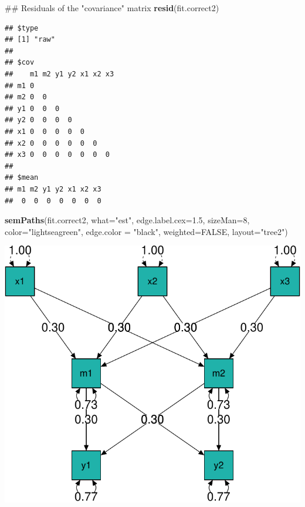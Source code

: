 \documentclass[]{article}
\newenvironment{Shaded}{\begin{snugshade}}{\end{snugshade}}
\newcommand{\KeywordTok}[1]{\textcolor[rgb]{0.13,0.29,0.53}{\textbf{#1}}}
\newcommand{\DataTypeTok}[1]{\textcolor[rgb]{0.13,0.29,0.53}{#1}}
\newcommand{\DecValTok}[1]{\textcolor[rgb]{0.00,0.00,0.81}{#1}}
\newcommand{\FloatTok}[1]{\textcolor[rgb]{0.00,0.00,0.81}{#1}}
\newcommand{\StringTok}[1]{\textcolor[rgb]{0.31,0.60,0.02}{#1}}
\newcommand{\OtherTok}[1]{\textcolor[rgb]{0.56,0.35,0.01}{#1}}
\newcommand{\NormalTok}[1]{#1}
\begin{document}
\begin{Shaded}
\begin{Highlighting}[]
\NormalTok{## Residuals of the "covariance" matrix}
\KeywordTok{resid}\NormalTok{(fit.correct2)}
\end{Highlighting}
\end{Shaded}

\begin{verbatim}
## $type
## [1] "raw"
## 
## $cov
##    m1 m2 y1 y2 x1 x2 x3
## m1 0                   
## m2 0  0                
## y1 0  0  0             
## y2 0  0  0  0          
## x1 0  0  0  0  0       
## x2 0  0  0  0  0  0    
## x3 0  0  0  0  0  0  0 
## 
## $mean
## m1 m2 y1 y2 x1 x2 x3 
##  0  0  0  0  0  0  0
\end{verbatim}

\begin{Shaded}
\begin{Highlighting}[]
\KeywordTok{semPaths}\NormalTok{(fit.correct2, }\DataTypeTok{what=}\StringTok{"est"}\NormalTok{, }\DataTypeTok{edge.label.cex=}\FloatTok{1.5}\NormalTok{, }
         \DataTypeTok{sizeMan=}\DecValTok{8}\NormalTok{, }\DataTypeTok{color=}\StringTok{"lightseagreen"}\NormalTok{, }\DataTypeTok{edge.color =} \StringTok{"black"}\NormalTok{, }
         \DataTypeTok{weighted=}\OtherTok{FALSE}\NormalTok{, }\DataTypeTok{layout=}\StringTok{"tree2"}\NormalTok{)}
\end{Highlighting}
\end{Shaded}

\includegraphics{Supplemental_materials_3_files/figure-latex/unnamed-chunk-11-1.pdf}
\end{document}
